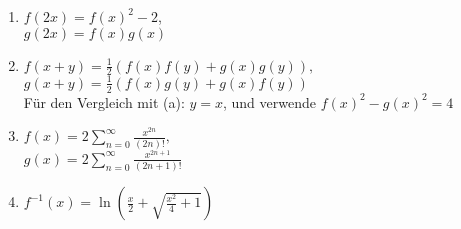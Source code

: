 \begin{enumerate}[label=(\alph*)]
    \item $f(2x)=f(x)^2-2$, \\
    $g(2x)=f(x)g(x)$
    \item $f(x+y)=\frac{1}{2}\left(f(x)f(y)+g(x)g(y)\right),$\\
    $g(x+y)=\frac{1}{2}\left(f(x)g(y)+g(x)f(y)\right)$\\
    Für den Vergleich mit (a): $y=x$, und verwende $f(x)^2-g(x)^2=4$
    \item $f(x)=2\sum\limits_{n=0}^\infty \frac{x^{2n}}{(2n)!},$\\
    $g(x)=2\sum\limits_{n=0}^\infty \frac{x^{2n+1}}{(2n+1)!}$
    \item $f^{-1}(x)=\ln\left(\frac{x}{2}+\sqrt{\frac{x^2}{4}+1}\right)$
\end{enumerate}